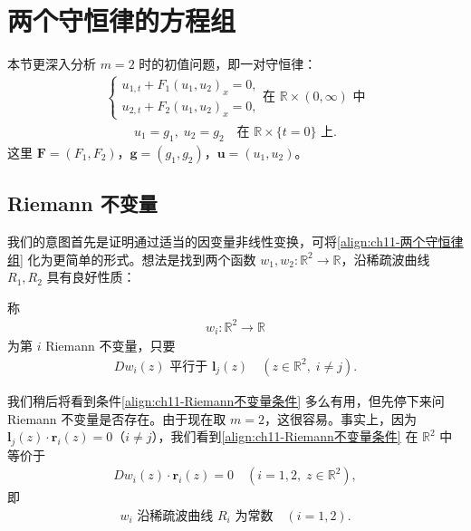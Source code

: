 \documentclass[../../main.tex]{subfiles}
\begin{document}
\section{两个守恒律的方程组}\label{section:ch11-两个守恒律}

本节更深入分析 $m=2$ 时的初值问题，即一对守恒律：
\begin{align}
\begin{cases}
u_{1,t}+F_1(u_1,u_2)_x=0,\\
u_{2,t}+F_2(u_1,u_2)_x=0,
\end{cases}
\text{在 } \mathbb{R}\times(0,\infty) \text{ 中}
\label{align:ch11-两个守恒律组}
\end{align}
\begin{align*}
u_1=g_1,\;u_2=g_2 \quad \text{在 } \mathbb{R}\times\{t=0\} \text{ 上}.
\end{align*}
这里 $\mathbf{F}=(F_1,F_2)$，$\mathbf{g}=(g_1,g_2)$，$\mathbf{u}=(u_1,u_2)$。

\subsection{Riemann 不变量}\label{subsection:ch11-Riemann不变量}

我们的意图首先是证明通过适当的因变量非线性变换，可将\eqref{align:ch11-两个守恒律组} 化为更简单的形式。想法是找到两个函数 $w_1,w_2:\mathbb{R}^2\to\mathbb{R}$，沿稀疏波曲线 $R_1,R_2$ 具有良好性质：

\begin{definition}\label{definition:ch11-Riemann不变量}
称
\begin{align*}
w_i:\mathbb{R}^2\to\mathbb{R}
\end{align*}
为第 $i$ Riemann 不变量，只要
\begin{align}
Dw_i(z) \text{ 平行于 } \mathbf{l}_j(z) \quad (z\in\mathbb{R}^2,\;i\neq j).
\label{align:ch11-Riemann不变量条件}
\end{align}
\end{definition}

我们稍后将看到条件\eqref{align:ch11-Riemann不变量条件} 多么有用，但先停下来问 Riemann 不变量是否存在。由于现在取 $m=2$，这很容易。事实上，因为 $\mathbf{l}_j(z)\cdot\mathbf{r}_i(z)=0$（$i\neq j$），我们看到\eqref{align:ch11-Riemann不变量条件} 在 $\mathbb{R}^2$ 中等价于
\begin{align}
Dw_i(z)\cdot\mathbf{r}_i(z)=0 \quad (i=1,2,\;z\in\mathbb{R}^2),
\label{align:ch11-Riemann不变量等价}
\end{align}
即
\begin{align}
w_i \text{ 沿稀疏波曲线 } R_i \text{ 为常数} \quad (i=1,2).
\label{align:ch11-Riemann不变量常数}
\end{align}
\end{document}

